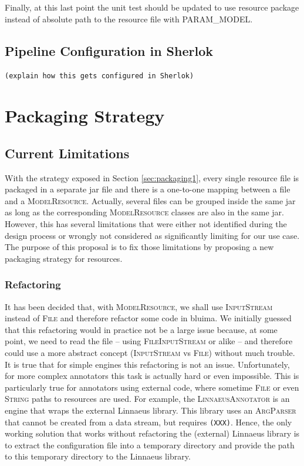 \documentclass{article}
\newcommand{\ID}[1]{{\textsc{#1}}}
\newcommand{\TODO}[1]{\texttt{\textcolor{YellowOrange}{(#1)}}} %
\begin{document}
Finally, at this last point the unit test should be updated to use resource package instead of
absolute path to the resource file with \ID{PARAM\_MODEL}.

\subsection{Pipeline Configuration in Sherlok}

\TODO{explain how this gets configured in Sherlok}

\section{Packaging Strategy}
\label{sec:packaging2}

\subsection{Current Limitations}

With the strategy exposed in Section \ref{sec:packaging1}, every single resource file is packaged in a separate jar file and there is a one-to-one mapping between a file and a \ID{ModelResource}. Actually, several files can be grouped inside the same jar as long as the corresponding \ID{ModelResource} classes are also in the same jar. However, this has several limitations that were either not identified during the design process or wrongly not considered as significantly limiting for our use case. The purpose of this proposal is to fix those limitations by proposing a new packaging strategy for resources.

\subsubsection{Refactoring}

It has been decided that, with \ID{ModelResource}, we shall use \ID{InputStream} instead of
\ID{File} and therefore refactor some code in bluima. We initially guessed that this refactoring
would in practice not be a large issue because, at some point, we need to read the file -- using
\ID{FileInputStream} or alike -- and therefore could use a more abstract concept (\ID{InputStream}
vs \ID{File}) without much trouble. It is true that for simple engines this refactoring is not an
issue. Unfortunately, for more complex annotators this task is actually hard or even impossible.
This is particularly true for annotators using external code, where sometime \ID{File} or even
\ID{String} paths to resources are used. For example, the \ID{LinnaeusAnnotator} is an engine that wraps the external Linnaeus library. This library uses an \ID{ArgParser} that cannot be created from a data stream, but requires \TODO{XXX}. Hence, the only working solution that works without refactoring the (external) Linnaeus library is to extract the configuration file into a temporary directory and provide the path to this temporary directory to the Linnaeus library.
\end{document}
